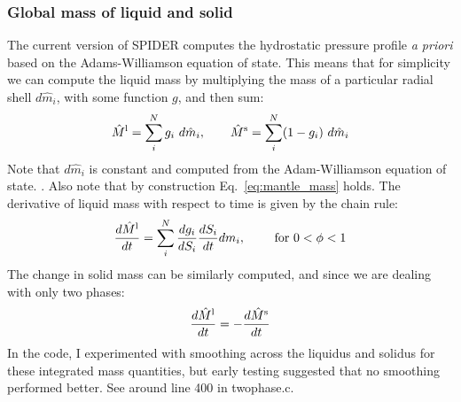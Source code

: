 \subsubsection{Global mass of liquid and solid}
The current version of SPIDER computes the hydrostatic pressure profile \emph{a priori} based on the Adams-Williamson equation of state.  This means that for simplicity we can compute the liquid mass by multiplying the mass of a particular radial shell $d\hat{m}_i$, with some function $g$, and then sum:%
\begin{equation}
\hat{M}^{\rm l} = \sum_i^N g_i \ d\hat{m}_i, \qquad \hat{M}^{\rm s} = \sum_i^N (1-g_i) \ d\hat{m}_i
\end{equation}
Note that $d\hat{m}_i$ is constant and computed from the Adam-Williamson equation of state.  .  Also note that by construction Eq.~\ref{eq:mantle_mass} holds.
The derivative of liquid mass with respect to time is given by the chain rule:
\begin{equation}
\frac{d \hat{M}^{\rm l}}{dt} = \sum_i^N \frac{d g_i}{d S_i} \frac{dS_i}{dt} dm_i, \qquad \text{ for } 0 < \phi < 1
\end{equation}
The change in solid mass can be similarly computed, and since we are dealing with only two phases:
\begin{equation}
\frac{d \hat{M}^{\rm l}}{dt} = -\frac{d \hat{M}^{\rm s}}{dt}
\end{equation}
In the code, I experimented with smoothing across the liquidus and solidus for these integrated mass quantities, but early testing suggested that no smoothing performed better. See around line 400 in twophase.c.
